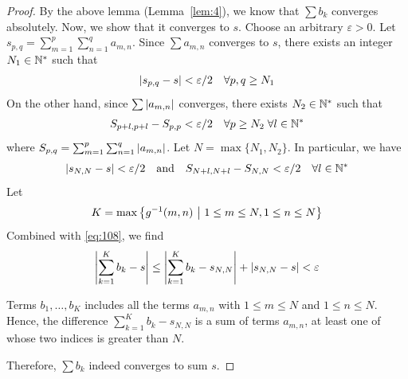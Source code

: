 \documentclass[thmcnt=section, 12pt]{my-elegantbook}
\begin{document}
\begin{proof}
    By the above lemma (Lemma~\ref{lem:4}), we know that $\sum b_k$ converges absolutely. Now, we show that it converges to $s$. Choose an arbitrary $\varepsilon > 0$. Let $s_{p,q} = \sum_{m=1}^{p} \sum_{n=1}^{q} a_{m,n}$. Since $\sum a_{m,n}$ converges to $s$, there exists an integer $N_1 \in \mathbb{N}^\ast$ such that 
    \begin{align*}
        \left\lvert s_{p,q} - s \right\rvert < \varepsilon / 2
        \quad 
        \forall p,q \geq N_1
    \end{align*}
    On the other hand, since $\sum \left\lvert a_{m,n} \right\rvert$ converges, there exists $N_2 \in \mathbb{N}^\ast$ such that 
    \begin{align*}
        S_{p+l, p+l} - S_{p,p} < \varepsilon / 2
        \quad
        \forall p \geq N_2 \; 
        \forall l \in \mathbb{N}^\ast
    \end{align*}
    where $S_{p,q} = \sum_{m=1}^{p} \sum_{n=1}^{q} \left\lvert a_{m,n} \right\rvert$. Let $N = \max\{N_1, N_2\}$. In particular, we have
    \begin{align}
        \left\lvert s_{N,N} - s \right\rvert < \varepsilon / 2
        \quad \text{and} \quad 
        S_{N+l,N+l} - S_{N,N} < \varepsilon / 2
        \quad \forall l \in \mathbb{N}^\ast
        \label{eq:108}
    \end{align}
    Let 
    \begin{align*}
        K = \max \left\{ g^{-1}(m,n) \ \middle| \ 1 \leq m \leq N, 1 \leq n \leq N \right\}
    \end{align*}
    Combined with \eqref{eq:108}, we find 
    \begin{align*}
        \left\lvert \sum_{k=1}^K b_k - s \right\rvert
        \leq \left\lvert \sum_{k=1}^K b_k - s_{N,N} \right\rvert
        + \left\lvert s_{N,N} - s \right\rvert
        < \varepsilon
    \end{align*}
    \begin{note}
        Terms $b_1, \ldots, b_K$ includes all the terms $a_{m,n}$ with $1 \leq m \leq N$ and $1 \leq n \leq N$. Hence, the difference $\sum_{k=1}^K b_k - s_{N, N}$ is a sum of terms $a_{m,n}$, at least one of whose two indices is greater than $N$.
    \end{note}
    
    \noindent Therefore, $\sum b_k$ indeed converges to sum $s$.


\end{proof}
\end{document}
